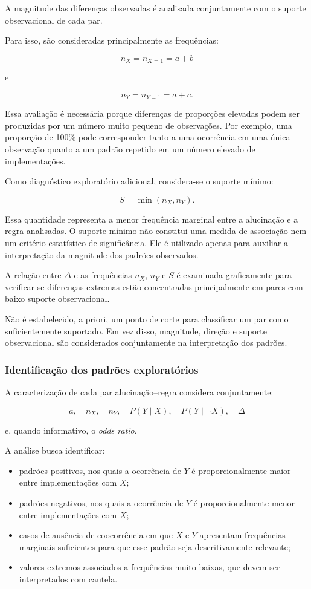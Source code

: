 A magnitude das diferenças observadas é analisada conjuntamente com o suporte observacional de cada par.

Para isso, são consideradas principalmente as frequências:

\[
n_X=n_{X=1}=a+b
\]

e

\[
n_Y=n_{Y=1}=a+c.
\]

Essa avaliação é necessária porque diferenças de proporções elevadas podem ser produzidas por um número muito pequeno de observações. Por exemplo, uma proporção de 100\% pode corresponder tanto a uma ocorrência em uma única observação quanto a um padrão repetido em um número elevado de implementações.

Como diagnóstico exploratório adicional, considera-se o suporte mínimo:

\[
S=\min(n_X,n_Y).
\]

Essa quantidade representa a menor frequência marginal entre a alucinação e a regra analisadas. O suporte mínimo não constitui uma medida de associação nem um critério estatístico de significância. Ele é utilizado apenas para auxiliar a interpretação da magnitude dos padrões observados.

A relação entre $\Delta$ e as frequências $n_X$, $n_Y$ e $S$ é examinada graficamente para verificar se diferenças extremas estão concentradas principalmente em pares com baixo suporte observacional.

Não é estabelecido, a priori, um ponto de corte para classificar um par como suficientemente suportado. Em vez disso, magnitude, direção e suporte observacional são considerados conjuntamente na interpretação dos padrões.

\subsubsection{Identificação dos padrões exploratórios}

A caracterização de cada par alucinação--regra considera conjuntamente:

\[
a,\quad
n_X,\quad
n_Y,\quad
P(Y\mid X),\quad
P(Y\mid \neg X),\quad
\Delta
\]

e, quando informativo, o \textit{odds ratio}.

A análise busca identificar:

\begin{itemize}
    \item padrões positivos, nos quais a ocorrência de $Y$ é proporcionalmente maior entre implementações com $X$;
    \item padrões negativos, nos quais a ocorrência de $Y$ é proporcionalmente menor entre implementações com $X$;
    \item casos de ausência de coocorrência em que $X$ e $Y$ apresentam frequências marginais suficientes para que esse padrão seja descritivamente relevante;
    \item valores extremos associados a frequências muito baixas, que devem ser interpretados com cautela.
\end{itemize}

